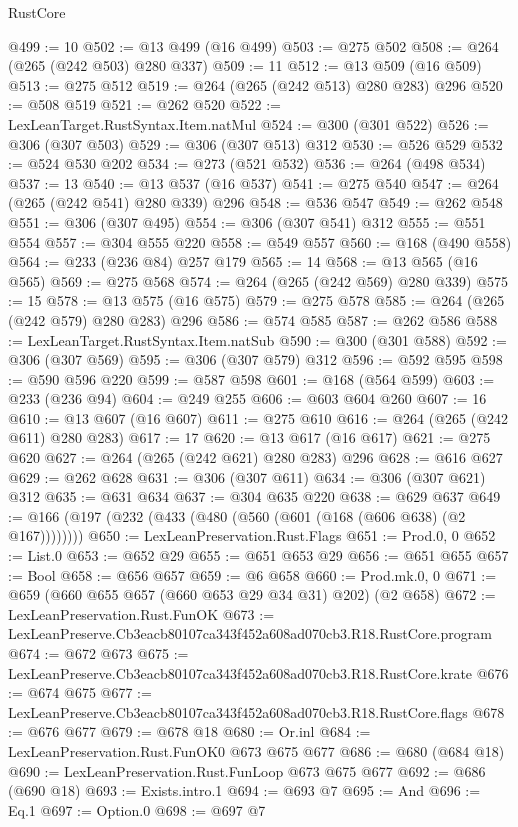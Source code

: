 \begin{lexlean}{RustCore}
\begin{coremodule}
@499 := 10
@502 := @13 @499 (@16 @499)
@503 := @275 @502
@508 := @264 (@265 (@242 @503) @280 @337)
@509 := 11
@512 := @13 @509 (@16 @509)
@513 := @275 @512
@519 := @264 (@265 (@242 @513) @280 @283) @296
@520 := @508 @519
@521 := @262 @520
@522 := LexLeanTarget.RustSyntax.Item.natMul
@524 := @300 (@301 @522)
@526 := @306 (@307 @503)
@529 := @306 (@307 @513) @312
@530 := @526 @529
@532 := @524 @530 @202
@534 := @273 (@521 @532)
@536 := @264 (@498 @534)
@537 := 13
@540 := @13 @537 (@16 @537)
@541 := @275 @540
@547 := @264 (@265 (@242 @541) @280 @339) @296
@548 := @536 @547
@549 := @262 @548
@551 := @306 (@307 @495)
@554 := @306 (@307 @541) @312
@555 := @551 @554
@557 := @304 @555 @220
@558 := @549 @557
@560 := @168 (@490 @558)
@564 := @233 (@236 @84) @257 @179
@565 := 14
@568 := @13 @565 (@16 @565)
@569 := @275 @568
@574 := @264 (@265 (@242 @569) @280 @339)
@575 := 15
@578 := @13 @575 (@16 @575)
@579 := @275 @578
@585 := @264 (@265 (@242 @579) @280 @283) @296
@586 := @574 @585
@587 := @262 @586
@588 := LexLeanTarget.RustSyntax.Item.natSub
@590 := @300 (@301 @588)
@592 := @306 (@307 @569)
@595 := @306 (@307 @579) @312
@596 := @592 @595
@598 := @590 @596 @220
@599 := @587 @598
@601 := @168 (@564 @599)
@603 := @233 (@236 @94)
@604 := @249 @255
@606 := @603 @604 @260
@607 := 16
@610 := @13 @607 (@16 @607)
@611 := @275 @610
@616 := @264 (@265 (@242 @611) @280 @283)
@617 := 17
@620 := @13 @617 (@16 @617)
@621 := @275 @620
@627 := @264 (@265 (@242 @621) @280 @283) @296
@628 := @616 @627
@629 := @262 @628
@631 := @306 (@307 @611)
@634 := @306 (@307 @621) @312
@635 := @631 @634
@637 := @304 @635 @220
@638 := @629 @637
@649 := @166 (@197 (@232 (@433 (@480 (@560 (@601 (@168 (@606 @638) (@2 @167))))))))
@650 := LexLeanPreservation.Rust.Flags
@651 := Prod.{0, 0}
@652 := List.{0}
@653 := @652 @29
@655 := @651 @653 @29
@656 := @651 @655
@657 := Bool
@658 := @656 @657
@659 := @6 @658
@660 := Prod.mk.{0, 0}
@671 := @659 (@660 @655 @657 (@660 @653 @29 @34 @31) @202) (@2 @658)
@672 := LexLeanPreservation.Rust.FunOK
@673 := LexLeanPreserve.Cb3eacb80107ca343f452a608ad070cb3.R18.RustCore.program
@674 := @672 @673
@675 := LexLeanPreserve.Cb3eacb80107ca343f452a608ad070cb3.R18.RustCore.krate
@676 := @674 @675
@677 := LexLeanPreserve.Cb3eacb80107ca343f452a608ad070cb3.R18.RustCore.flags
@678 := @676 @677
@679 := @678 @18
@680 := Or.inl
@684 := LexLeanPreservation.Rust.FunOK0 @673 @675 @677
@686 := @680 (@684 @18)
@690 := LexLeanPreservation.Rust.FunLoop @673 @675 @677
@692 := @686 (@690 @18)
@693 := Exists.intro.{1}
@694 := @693 @7
@695 := And
@696 := Eq.{1}
@697 := Option.{0}
@698 := @697 @7

\end{coremodule}
\end{lexlean}
